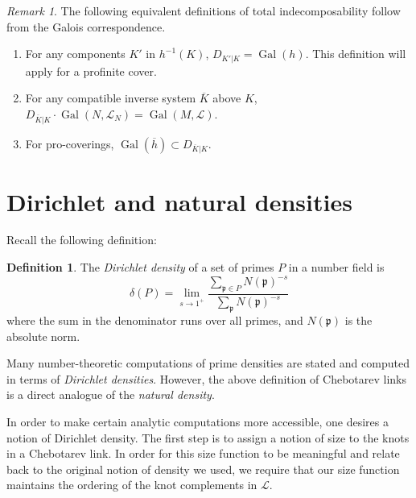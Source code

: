 \documentclass{amsart}
\theoremstyle{plain}
\theoremstyle{definition}
\newtheorem{Def}[theorem]{Definition}
\theoremstyle{plain}
\theoremstyle{plain}
\theoremstyle{plain}
\theoremstyle{remark}
\newtheorem{remark}[theorem]{Remark}
\theoremstyle{remark}
\theoremstyle{plain}
\theoremstyle{definition}
\theoremstyle{plain}
\DeclareMathOperator{\Gal}{\mathrm{Gal}}
\newcounter{main}
\theoremstyle{plain}
\theoremstyle{plain}
\numberwithin{equation}{section}
\begin{document}
\begin{remark}
The following equivalent definitions of total indecomposability follow from the Galois correspondence.
\begin{enumerate}
    \item For any components $K'$ in $h^{-1}(K)$, $D_{K'|K} = \Gal(h)$. This definition will apply for a profinite cover. 
    \item For any compatible inverse system $\overline{K}$ above $K$, $D_{\overline{K}|K} \cdot \Gal(N, \mathcal{L}_N) = \Gal(M, \mathcal{L})$. 
    \item For pro-coverings, $\Gal(\overline{h}) \subset D_{\overline{K}|K}$. 
\end{enumerate}
\end{remark}

\section{Dirichlet and natural densities}\label{sec:densities}

Recall the following definition:
\begin{Def}
The \emph{Dirichlet density} of a set of primes $P$ in a number field is 
\begin{equation}
    \delta(P) = \lim_{s \to 1^+}\frac{\sum_{\mathfrak{p} \in P}N(\mathfrak{p})^{-s}}{\sum_{\mathfrak{p}}N(\mathfrak{p})^{-s}}
\end{equation}
where the sum in the denominator runs over all primes, and $N(\mathfrak{p})$ is the absolute norm. 
\end{Def}

Many number-theoretic computations of prime densities are stated and computed in terms of \emph{Dirichlet densities}. However, the above definition of Chebotarev links is a direct analogue of the \emph{natural density}.

\medskip

In order to make certain analytic computations more accessible, one desires a notion of Dirichlet density. The first step is to assign a notion of size to the knots in a Chebotarev link. In order for this size function to be meaningful and relate back to the original notion of density we used, we require that our size function maintains the ordering of the knot complements in $\mathcal{L}$.
\end{document}
